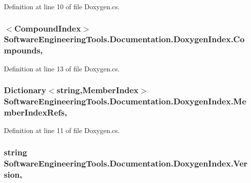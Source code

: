 Definition at line 10 of file Doxygen.\+cs.

\hypertarget{class_software_engineering_tools_1_1_documentation_1_1_doxygen_index_a947083d15b69cc2e070f905c0e10c129}{
\subsubsection[{Compounds}]{$<${\bf Compound\+Index}$>$ Software\+Engineering\+Tools.\+Documentation.\+Doxygen\+Index.\+Compounds\hspace{0.3cm}{\ttfamily [get]}, {\ttfamily [set]}}}\label{class_software_engineering_tools_1_1_documentation_1_1_doxygen_index_a947083d15b69cc2e070f905c0e10c129}


Definition at line 13 of file Doxygen.\+cs.

\hypertarget{class_software_engineering_tools_1_1_documentation_1_1_doxygen_index_a622b810e809f28139b79b1f68219d4a3}{
\subsubsection[{Member\+Index\+Refs}]{\setlength{\rightskip}{0pt plus 5cm}Dictionary$<$string,{\bf Member\+Index}$>$ Software\+Engineering\+Tools.\+Documentation.\+Doxygen\+Index.\+Member\+Index\+Refs\hspace{0.3cm}{\ttfamily [get]}, {\ttfamily [set]}}}\label{class_software_engineering_tools_1_1_documentation_1_1_doxygen_index_a622b810e809f28139b79b1f68219d4a3}


Definition at line 11 of file Doxygen.\+cs.

\hypertarget{class_software_engineering_tools_1_1_documentation_1_1_doxygen_index_a2404d2a8a639f5a475a044a1ce37f6df}{
\subsubsection[{Version}]{\setlength{\rightskip}{0pt plus 5cm}string Software\+Engineering\+Tools.\+Documentation.\+Doxygen\+Index.\+Version\hspace{0.3cm}{\ttfamily [get]}, {\ttfamily [set]}}}\label{class_software_engineering_tools_1_1_documentation_1_1_doxygen_index_a2404d2a8a639f5a475a044a1ce37f6df}


